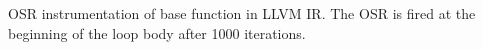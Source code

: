 \label{fig:isordfrom} OSR instrumentation of base function in LLVM IR. The OSR is fired at the beginning of the loop body after 1000 iterations.
